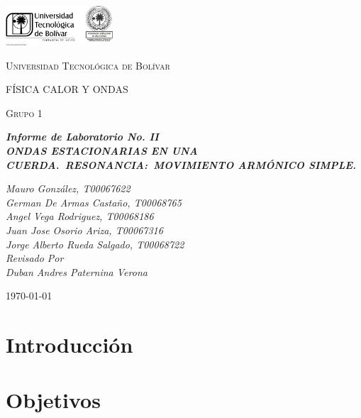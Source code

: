 \documentclass[twocolumn, 12pt]{article}
\begin{document}
\begin{titlepage}
    \centering
    \includegraphics[width=0.3\textwidth]{Images/logo_utb.png}\par\vspace{1cm}
    {\scshape\LARGE Universidad Tecnológica de Bolívar \par}
    \vspace{1cm}

    {\scshape\Large FÍSICA CALOR Y ONDAS \par}
    \vspace{.2cm}

    {\scshape\Large Grupo 1 \par}
    \vspace{1cm}
    \slshape {\Large \bfseries{}Informe de Laboratorio No. II\\}
    \slshape {\small \bfseries{} ONDAS ESTACIONARIAS EN UNA CUERDA.~RESONANCIA:\@{}~MOVIMIENTO ARMÓNICO SIMPLE.}
    \vspace{2cm}

    \slshape {\itshape{} Mauro González, T00067622 \\}
    \slshape {\itshape{} German De Armas Castaño, T00068765 \\}
    \slshape {\itshape{} Angel Vega Rodriguez, T00068186 \\}
    \slshape {\itshape{} Juan Jose Osorio Ariza, T00067316 \\}
    \slshape {\itshape{} Jorge Alberto Rueda Salgado, T00068722 \\}
    \vfill
    Revisado Por \\
    Duban Andres Paternina Verona\\
    {\large \today\par}
\end{titlepage}


\section{Introducción}

\section{Objetivos}
\end{document}
